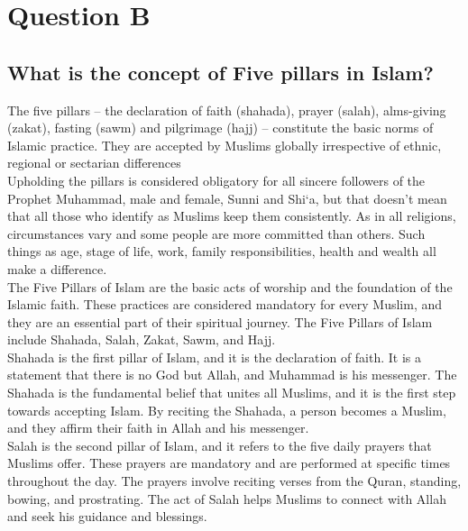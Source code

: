 \documentclass[11pt]{article}
\begin{document}
\section{Question B}


\subsection{What is the concept of Five pillars in Islam?}

The five pillars – the declaration of faith (shahada), prayer (salah), alms-giving (zakat), fasting (sawm) and pilgrimage (hajj) – constitute the basic norms of Islamic practice. They are accepted by Muslims globally irrespective of ethnic, regional or sectarian differences\\

Upholding the pillars is considered obligatory for all sincere followers of the Prophet Muhammad, male and female, Sunni and Shi‘a, but that doesn’t mean that all those who identify as Muslims keep them consistently. As in all religions, circumstances vary and some people are more committed than others. Such things as age, stage of life, work, family responsibilities, health and wealth all make a difference.\\

The Five Pillars of Islam are the basic acts of worship and the foundation of the Islamic faith. These practices are considered mandatory for every Muslim, and they are an essential part of their spiritual journey. The Five Pillars of Islam include Shahada, Salah, Zakat, Sawm, and Hajj.\\

Shahada is the first pillar of Islam, and it is the declaration of faith. It is a statement that there is no God but Allah, and Muhammad is his messenger. The Shahada is the fundamental belief that unites all Muslims, and it is the first step towards accepting Islam. By reciting the Shahada, a person becomes a Muslim, and they affirm their faith in Allah and his messenger.\\

Salah is the second pillar of Islam, and it refers to the five daily prayers that Muslims offer. These prayers are mandatory and are performed at specific times throughout the day. The prayers involve reciting verses from the Quran, standing, bowing, and prostrating. The act of Salah helps Muslims to connect with Allah and seek his guidance and blessings.\\
\end{document}
